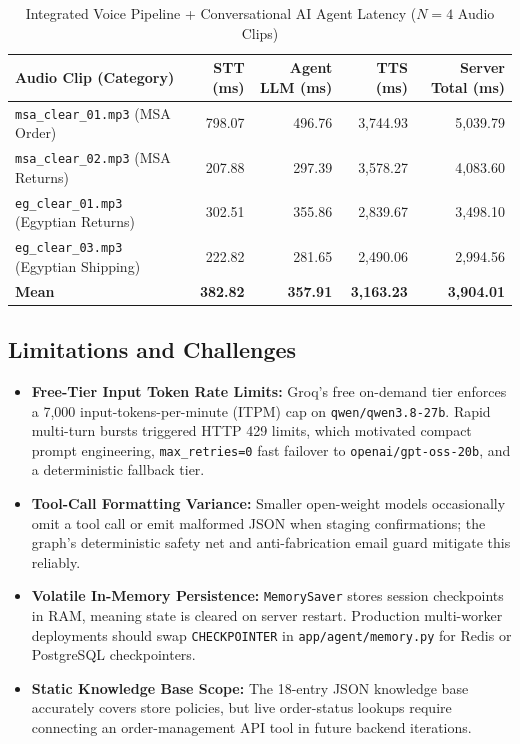 \begin{table}[htbp]
\centering
\caption{Integrated Voice Pipeline + Conversational AI Agent Latency ($N=4$ Audio Clips)}
\label{tab:agent_voice_integration}
\begin{tabular}{lrrrr}
\toprule
\textbf{Audio Clip (Category)} & \textbf{STT (ms)} & \textbf{Agent LLM (ms)} & \textbf{TTS (ms)} & \textbf{Server Total (ms)} \\
\midrule
\texttt{msa\_clear\_01.mp3} (MSA Order) & 798.07 & 496.76 & 3,744.93 & 5,039.79 \\
\texttt{msa\_clear\_02.mp3} (MSA Returns) & 207.88 & 297.39 & 3,578.27 & 4,083.60 \\
\texttt{eg\_clear\_01.mp3} (Egyptian Returns) & 302.51 & 355.86 & 2,839.67 & 3,498.10 \\
\texttt{eg\_clear\_03.mp3} (Egyptian Shipping) & 222.82 & 281.65 & 2,490.06 & 2,994.56 \\
\midrule
\textbf{Mean} & \textbf{382.82} & \textbf{357.91} & \textbf{3,163.23} & \textbf{3,904.01} \\
\bottomrule
\end{tabular}
\end{table}

\subsection{Limitations and Challenges}
\label{subsec:agent_limitations}

\begin{itemize}
    \item \textbf{Free-Tier Input Token Rate Limits:} Groq's free on-demand tier enforces a 7,000 input-tokens-per-minute (ITPM) cap on \texttt{qwen/qwen3.8-27b}. Rapid multi-turn bursts triggered HTTP 429 limits, which motivated compact prompt engineering, \texttt{max\_retries=0} fast failover to \texttt{openai/gpt-oss-20b}, and a deterministic fallback tier.
    \item \textbf{Tool-Call Formatting Variance:} Smaller open-weight models occasionally omit a tool call or emit malformed JSON when staging confirmations; the graph's deterministic safety net and anti-fabrication email guard mitigate this reliably.
    \item \textbf{Volatile In-Memory Persistence:} \texttt{MemorySaver} stores session checkpoints in RAM, meaning state is cleared on server restart. Production multi-worker deployments should swap \texttt{CHECKPOINTER} in \texttt{app/agent/memory.py} for Redis or PostgreSQL checkpointers.
    \item \textbf{Static Knowledge Base Scope:} The 18-entry JSON knowledge base accurately covers store policies, but live order-status lookups require connecting an order-management API tool in future backend iterations.
\end{itemize}
